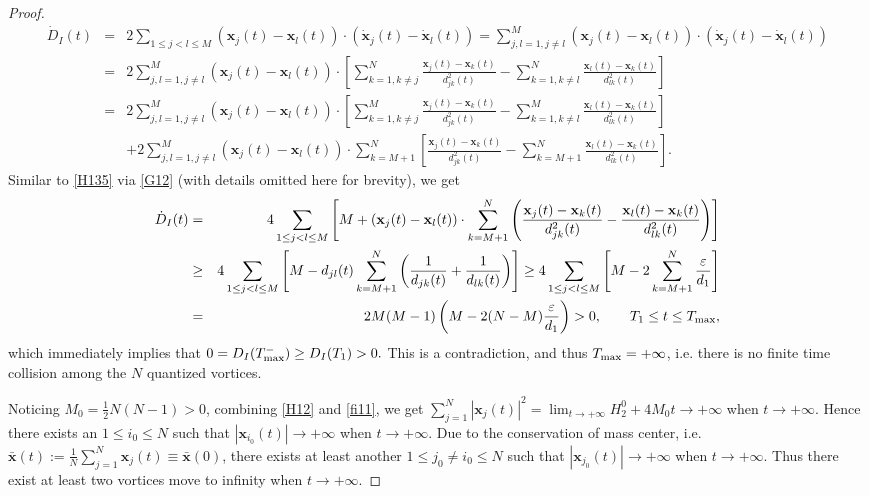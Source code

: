 \documentclass{aims}
\theoremstyle{plain}
\theoremstyle{definition}
\newcommand{\bx}{{\mathbf x}}
\newcommand{\nn}{\nonumber}
\newcommand{\bea}{\begin{eqnarray}}
\newcommand{\eea}{\end{eqnarray} }
\begin{document}
\begin{proof}
\bea
\dot D_I(t)&=&2\sum_{1\leq j<l\leq M}(\mathbf
x_j(t)-\mathbf x_l(t))\cdot(\dot{\mathbf x}_j(t)-\dot {\mathbf x}_l(t))=\sum_{j,l=1,j\ne l}^M(\mathbf
x_j(t)-\mathbf x_l(t))\cdot(\dot{\mathbf x}_j(t)-\dot {\mathbf x}_l(t))\nn\\
&=&2\sum_{j,l=1,j\ne l}^M(\mathbf
x_j(t)-\mathbf x_l(t))\cdot\left[\sum_{k=1,k\ne j}^N  \frac{\bx_j(t)-\bx_k(t)} {d_{jk}^2(t)}-\sum_{k=1,k\ne l}^N  \frac{\bx_l(t)-\bx_k(t)} {d_{lk}^2(t)}\right]\nn\\
&=&2\sum_{j,l=1,j\ne l}^M(\mathbf
x_j(t)-\mathbf x_l(t))\cdot\left[\sum_{k=1,k\ne j}^M \frac{\bx_j(t)-\bx_k(t)} {d_{jk}^2(t)}- \sum_{k=1,k\ne l}^M \frac{\bx_l(t)-\bx_k(t)} {d_{lk}^2(t)}\right]\nn\\
&&+2\sum_{j,l=1,j\ne l}^M(\mathbf
x_j(t)-\mathbf x_l(t))\cdot\sum_{k=M+1}^N  \left[\frac{\bx_j(t)-\bx_k(t)} {d_{jk}^2(t)}-\sum_{k=M+1}^N \frac{\bx_l(t)-\bx_k(t)} {d_{lk}^2(t)}\right].\nonumber
\eea
Similar to \eqref{H135} via \eqref{G12} (with details omitted here for brevity), we get
\bea\label{da}
\dot D_I(t)&=&4\sum_{1\leq j<l \leq M}\left[M+(\mathbf
x_j(t)-\mathbf x_l(t))\cdot \sum_{k=M+1}^N\left(\frac{ \bx_j(t)-\bx_k(t)}{d_{jk}^2(t)}-\frac{\bx_l(t)-\bx_k(t)}{d_{lk}^2(t)}\right)\right]\nn\\
&\ge&4\sum_{1\leq j<l \leq M}\left[M-d_{jl}(t)\sum_{k=M+1}^N\left(\frac{1}{d_{jk}(t)}+
\frac{1}{d_{lk}(t)}\right)\right]\ge4\sum_{1\leq j<l \leq
M}\left[M-2\sum_{k=M+1}^N\frac{\varepsilon}{d_1}\right]\nn\\
&=&2M(M-1)\left(M-2(N-M)\frac{\varepsilon}{d_1}\right) >0,
\qquad T_1\le t\le T_{\rm max},
\eea
which immediately implies that $0=D_I(T_{\rm max}^-)\ge D_I(T_1)>0.$
This is a contradiction, and thus $T_{\rm max}=+\infty$, i.e.
there is no finite time collision among the $N$ quantized vortices.

Noticing $M_0=\frac{1}{2}N(N-1)>0$, combining \eqref{H12} and \eqref{fi11},
we get $\sum_{j=1}^N|\bx_j(t)|^2=
\lim_{t\to+\infty}H_2^0+4M_0t\to +\infty$ when
$t\to+\infty$.  Hence there exists an $1\le i_0\le N$ such that
$|\bx_{i_0}(t)|\to +\infty$ when $t\to+\infty$.
Due to the conservation of mass center, i.e. $\bar \bx(t):=\frac{1}{N}\sum_{j=1}^N \bx_j(t)\equiv \bar \bx(0)$,
there exists at least another $1\le j_0\neq i_0\le N$
such that $|\bx_{j_0}(t)|\to +\infty$ when $t\to+\infty$.
Thus there exist at least two
vortices  move to infinity when $t\rightarrow +\infty$.
\end{proof}
\end{document}
